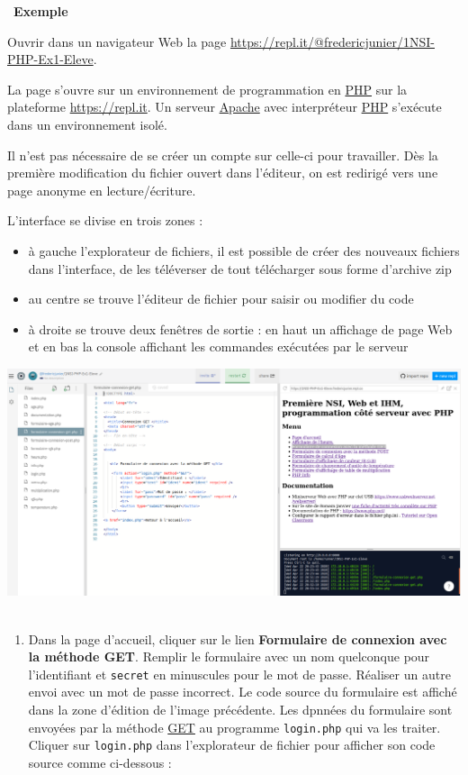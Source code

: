 \documentclass[
  11pt,
]{article}
\newcommand{\passthrough}[1]{#1}
\providecommand{\tightlist}{%
  \setlength{\itemsep}{0pt}\setlength{\parskip}{0pt}}
\newcounter{def}
\newcounter{exple}
\newenvironment{exemple}[1]
{\par \medskip   \addtocounter{exple}{1} \noindent  
\begin{bclogo}[arrondi =0.1,   noborder = true, logo=\bclampe, marge=4]{~\textbf{Exemple} \textbf{\theexple} {\itshape #1} }  \par}
{
\end{bclogo}
 \par \bigskip }
\newcounter{prog}
\newcounter{logi}
\begin{document}
\begin{exemple}{}

Ouvrir dans un navigateur Web la page
\url{https://repl.it/@fredericjunier/1NSI-PHP-Ex1-Eleve}.

La page s'ouvre sur un environnement de programmation en
\href{https://developer.mozilla.org/fr/docs/Glossaire/PHP}{PHP} sur la
plateforme \url{https://repl.it}. Un serveur
\href{https://doc.ubuntu-fr.org/apache2}{Apache} avec interpréteur
\href{https://developer.mozilla.org/fr/docs/Glossaire/PHP}{PHP}
s'exécute dans un environnement isolé.

Il n'est pas nécessaire de se créer un compte sur celle-ci pour
travailler. Dès la première modification du fichier ouvert dans
l'éditeur, on est redirigé vers une page anonyme en lecture/écriture.

L'interface se divise en trois zones :

\begin{itemize}
\tightlist
\item
  à gauche l'explorateur de fichiers, il est possible de créer des
  nouveaux fichiers dans l'interface, de les téléverser de tout
  télécharger sous forme d'archive zip
\item
  au centre se trouve l'éditeur de fichier pour saisir ou modifier du
  code\\
\item
  à droite se trouve deux fenêtres de sortie : en haut un affichage de
  page Web et en bas la console affichant les commandes exécutées par le
  serveur
\end{itemize}

\includegraphics{images/interface-replit.png}~

\begin{enumerate}
\def\labelenumi{\arabic{enumi}.}
\item
  Dans la page d'accueil, cliquer sur le lien \textbf{Formulaire de
  connexion avec la méthode GET}. Remplir le formulaire avec un nom
  quelconque pour l'identifiant et \passthrough{\lstinline!secret!} en
  minuscules pour le mot de passe. Réaliser un autre envoi avec un mot
  de passe incorrect. Le code source du formulaire est affiché dans la
  zone d'édition de l'image précédente. Les dpnnées du formulaire sont
  envoyées par la méthode
  \href{https://developer.mozilla.org/fr/docs/Web/HTTP/M\%C3\%A9thode/GET}{GET}
  au programme \passthrough{\lstinline!login.php!} qui va les traiter.
  Cliquer sur \passthrough{\lstinline!login.php!} dans l'explorateur de
  fichier pour afficher son code source comme ci-dessous :


\end{enumerate}
\end{exemple}
\end{document}
